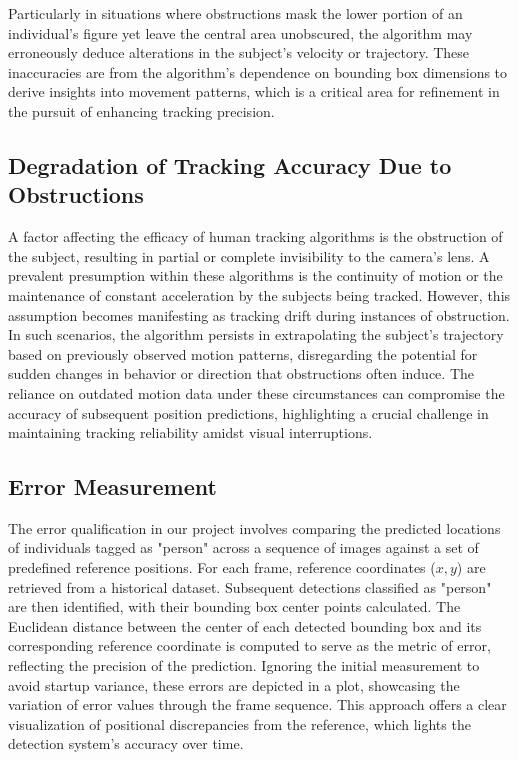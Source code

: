 \documentclass{article}
\begin{document}
Particularly in situations where obstructions mask the lower portion of an individual's figure yet leave the central area unobscured, the algorithm may erroneously deduce alterations in the subject's velocity or trajectory. These inaccuracies are from the algorithm's dependence on bounding box dimensions to derive insights into movement patterns, which is a critical area for refinement in the pursuit of enhancing tracking precision.

\subsection{Degradation of Tracking Accuracy Due to Obstructions}

A factor affecting the efficacy of human tracking algorithms is the obstruction of the subject, resulting in partial or complete invisibility to the camera's lens. A prevalent presumption within these algorithms is the continuity of motion or the maintenance of constant acceleration by the subjects being tracked. However, this assumption becomes manifesting as tracking drift during instances of obstruction. In such scenarios, the algorithm persists in extrapolating the subject's trajectory based on previously observed motion patterns, disregarding the potential for sudden changes in behavior or direction that obstructions often induce. The reliance on outdated motion data under these circumstances can compromise the accuracy of subsequent position predictions, highlighting a crucial challenge in maintaining tracking reliability amidst visual interruptions.

\subsection{Error Measurement}

The error qualification in our project involves comparing the predicted locations of individuals tagged as "person" across a sequence of images against a set of predefined reference positions. For each frame, reference coordinates (\(x, y\)) are retrieved from a historical dataset. Subsequent detections classified as "person" are then identified, with their bounding box center points calculated. The Euclidean distance between the center of each detected bounding box and its corresponding reference coordinate is computed to serve as the metric of error, reflecting the precision of the prediction. Ignoring the initial measurement to avoid startup variance, these errors are depicted in a plot, showcasing the variation of error values through the frame sequence. This approach offers a clear visualization of positional discrepancies from the reference, which lights the detection system's accuracy over time.
\end{document}
